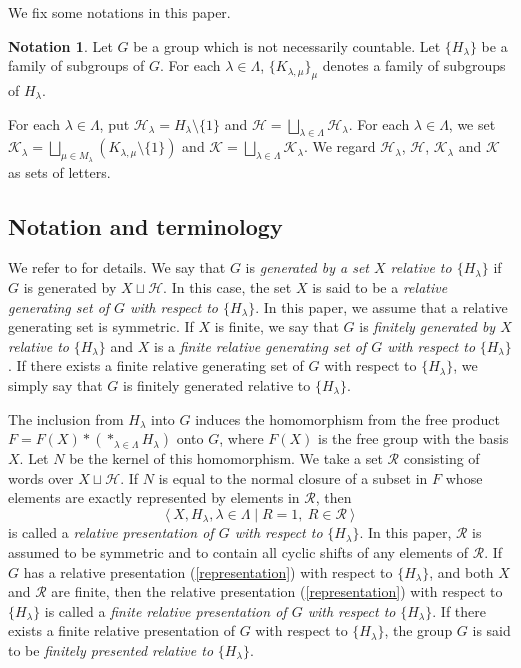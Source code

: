 \documentclass{amsart}
\theoremstyle{definition}
\newtheorem{Not}[Thm]{Notation}
\begin{document}
We fix some notations in this paper. 
\begin{Not}
Let $G$ be a group which is not necessarily countable.  
Let $\{H_\lambda \}$ be a family of subgroups of $G$. 
For each $\lambda\in\Lambda$, $\{K_{\lambda, \mu} \}_\mu$ denotes a family of subgroups of $H_\lambda$. 

For each $\lambda\in \Lambda$, put ${\mathcal H}_\lambda=H_\lambda\setminus\{1\}$ and ${\mathcal H}=\bigsqcup_{\lambda\in\Lambda} {\mathcal H}_\lambda$. 
For each $\lambda\in\Lambda$, we set ${\mathcal K}_\lambda=\bigsqcup_{\mu\in M_\lambda} (K_{\lambda,\mu}\setminus \{1\})$ and ${\mathcal K}=\bigsqcup_{\lambda\in\Lambda} {\mathcal K}_\lambda$. 
We regard ${\mathcal H}_\lambda$, ${\mathcal H}$, ${\mathcal K}_\lambda$ and ${\mathcal K}$ as sets of letters. 
\end{Not}
\subsection{Notation and terminology}\label{def_rh}

We refer to \cite{Osi06} for details. 
We say that $G$ is {\it generated by a set $X$ relative to $\{H_\lambda\}$} if $G$ is generated by $X\sqcup {\mathcal H}$. 
In this case, the set $X$ is said to be a {\it relative generating set of $G$ with respect to $\{H_\lambda\}$}. 
In this paper, we assume that a relative generating set is symmetric. 
If $X$ is finite, we say that $G$ is {\it finitely generated by $X$ relative to} $\{H_\lambda\}$ and $X$ is a {\it finite relative generating set of $G$ with respect to} $\{H_\lambda\}$.  
If there exists a finite relative generating set of $G$ with respect to $\{H_\lambda\}$, we simply say that $G$ is finitely generated relative to $\{H_\lambda\}$. 

The inclusion from $H_\lambda$ into $G$ induces the homomorphism
from the free product $F=F(X) \ast (\ast_{\lambda \in \Lambda} H_\lambda)
$ onto $G$, where $F(X)$ is the free group with the basis $X$.
Let $N$ be the kernel of this homomorphism.
We take a set ${\mathcal R}$ consisting of words over $X \sqcup {\mathcal H}$. 
If $N$ is equal to the normal closure of a subset in $F$ whose elements are exactly represented by elements in ${\mathcal R}$, then 
\begin{equation}\label{representation}
\langle \ X, H_\lambda, \lambda\in\Lambda \mid R=1, \ R\in{\mathcal R} \ \rangle
\end{equation}
is called a {\it relative presentation of $G$ with respect to} $\{H_\lambda\}$. 
In this paper, ${\mathcal R}$ is assumed to be symmetric and to contain all cyclic shifts of any elements of ${\mathcal R}$. 
If $G$ has a relative presentation (\ref{representation}) with respect to $\{H_\lambda\}$, and both $X$ and ${\mathcal R}$ are finite, then the relative presentation (\ref{representation}) with respect to $\{H_\lambda\}$ is called a {\it finite relative presentation of $G$ with respect to} $\{H_\lambda\}$. 
If there exists a finite relative presentation of $G$ with respect to $\{H_\lambda\}$, the group $G$ is said to be {\it finitely presented relative to} $\{H_\lambda\}$. 
\end{document}
